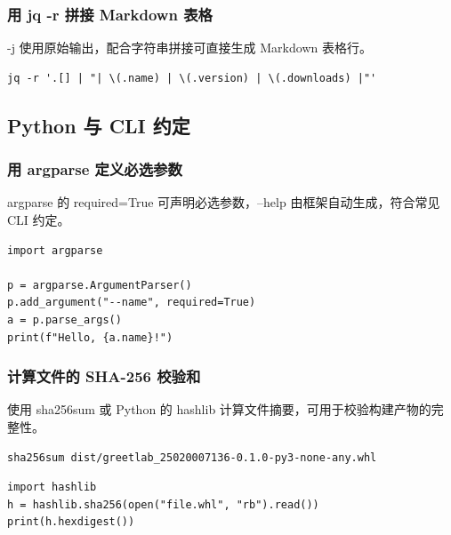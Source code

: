 \subsubsection{用 jq -r 拼接 Markdown 表格}
-j 使用原始输出，配合字符串拼接可直接生成 Markdown 表格行。
\begin{verbatim}
jq -r '.[] | "| \(.name) | \(.version) | \(.downloads) |"'
\end{verbatim}

\subsection{Python 与 CLI 约定}

\subsubsection{用 argparse 定义必选参数}
argparse 的 required=True 可声明必选参数，--help 由框架自动生成，符合常见 CLI 约定。
\begin{verbatim}
import argparse

p = argparse.ArgumentParser()
p.add_argument("--name", required=True)
a = p.parse_args()
print(f"Hello, {a.name}!")
\end{verbatim}

\subsubsection{计算文件的 SHA-256 校验和}
使用 sha256sum 或 Python 的 hashlib 计算文件摘要，可用于校验构建产物的完整性。
\begin{verbatim}
sha256sum dist/greetlab_25020007136-0.1.0-py3-none-any.whl
\end{verbatim}

\begin{verbatim}
import hashlib
h = hashlib.sha256(open("file.whl", "rb").read())
print(h.hexdigest())
\end{verbatim}
